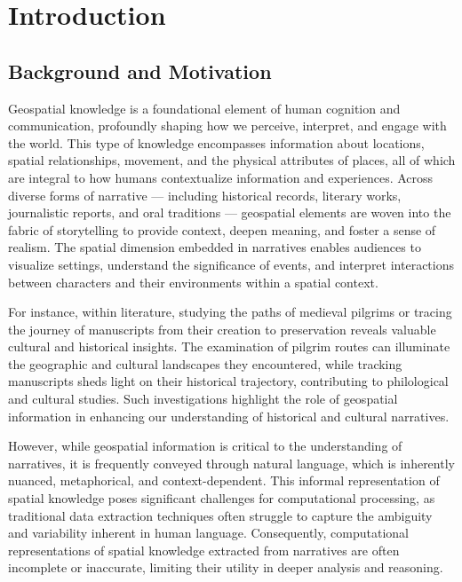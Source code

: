\chapter{Introduction}\label{chap:introduction}

\section{Background and Motivation}\label{I-sec:backroundAndMotivation}

Geospatial knowledge is a foundational element of human cognition and communication, profoundly shaping how we perceive, interpret, and engage with the world. This type of knowledge encompasses information about locations, spatial relationships, movement, and the physical attributes of places, all of which are integral to how humans contextualize information and experiences. Across diverse forms of narrative — including historical records, literary works, journalistic reports, and oral traditions — geospatial elements are woven into the fabric of storytelling to provide context, deepen meaning, and foster a sense of realism. The spatial dimension embedded in narratives enables audiences to visualize settings, understand the significance of events, and interpret interactions between characters and their environments within a spatial context.

For instance, within literature, studying the paths of medieval pilgrims or tracing the journey of manuscripts from their creation to preservation reveals valuable cultural and historical insights. The examination of pilgrim routes can illuminate the geographic and cultural landscapes they encountered, while tracking manuscripts sheds light on their historical trajectory, contributing to philological and cultural studies. Such investigations highlight the role of geospatial information in enhancing our understanding of historical and cultural narratives.

However, while geospatial information is critical to the understanding of narratives, it is frequently conveyed through natural language, which is inherently nuanced, metaphorical, and context-dependent. This informal representation of spatial knowledge poses significant challenges for computational processing, as traditional data extraction techniques often struggle to capture the ambiguity and variability inherent in human language. Consequently, computational representations of spatial knowledge extracted from narratives are often incomplete or inaccurate, limiting their utility in deeper analysis and reasoning.

